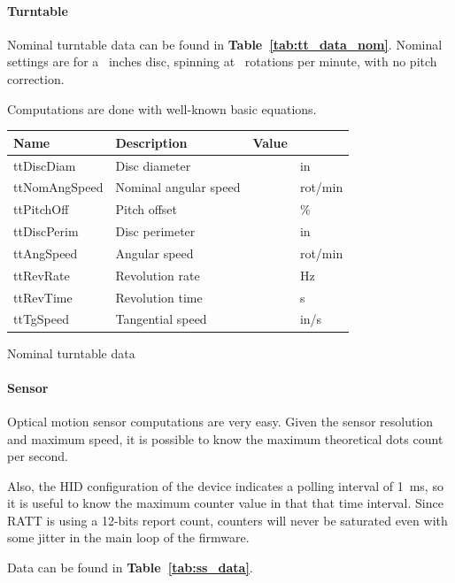 \documentclass[a4paper,10pt]{article}
\makeatletter
\newenvironment{tablehere}{\def\@captype{table}\vspace{2ex}}{\vspace{2ex}}
\newcommand{\citet}[1]{\textbf{Table~\ref{#1}}}
\makeatother
\begin{document}
\begin{multicols}{2}
\paragraph{Turntable}
Nominal turntable data can be found in \citet{tab:tt_data_nom}. Nominal
settings are for a \ttDiscDiam\ inches disc, spinning at \ttNomAngSpeed\ 
rotations per minute, with no pitch correction.

Computations are done with well-known basic equations.

\begin{tablehere}
\centering \footnotesize
\begin{tabular}{|l|l|rl|}
\hline
\textbf{Name} & \textbf{Description} & \textbf{Value} &	\\
\hline
ttDiscDiam		& Disc diameter			& \ttDiscDiam		& in			\	& Nominal angular speed	& \ttNomAngSpeed	& rot/min		\		& Pitch offset			& \ttPitchOff		& \%			\\
\hline
ttDiscPerim		& Disc perimeter		& \ttDiscPerim		& in			\		& Angular speed			& \ttAngSpeed		& rot/min		\		& Revolution rate		& \ttRevRate		& Hz			\		& Revolution time		& \ttRevTime		& s				\		& Tangential speed		& \ttTgSpeed		& in/s			\\
\hline
\end{tabular}
\caption{Nominal turntable data}
\label{tab:tt_data_nom}
\end{tablehere}


\paragraph{Sensor}
Optical motion sensor computations are very easy. Given the sensor resolution
and maximum speed, it is possible to know the maximum theoretical dots count
per second.

Also, the HID configuration of the device indicates a polling interval of
1~ms, so it is useful to know the maximum counter value in that that time
interval. Since RATT is using a 12-bits report count, counters will never be
saturated even with some jitter in the main loop of the firmware.

Data can be found in \citet{tab:ss_data}.


\end{multicols}
\end{document}
